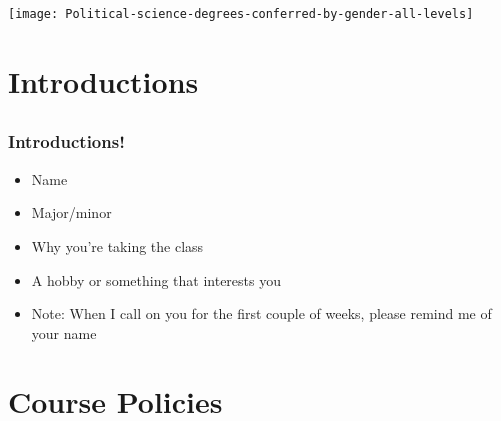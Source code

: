 \documentclass{beamer}
\begin{document}
\begin{frame}


\texttt{[image: Political-science-degrees-conferred-by-gender-all-levels]}



\end{frame}



\section{Introductions} %




\subsection{} %

\begin{frame}
\frametitle{Introductions!}
\begin{itemize}
\item Name 
\item Major/minor
\item Why you're taking the class
\item A hobby or something that interests you
\item Note: When I call on you for the first couple of weeks, please remind me of your name
\end{itemize}

\end{frame}



\section{Course Policies} %

\end{document}
